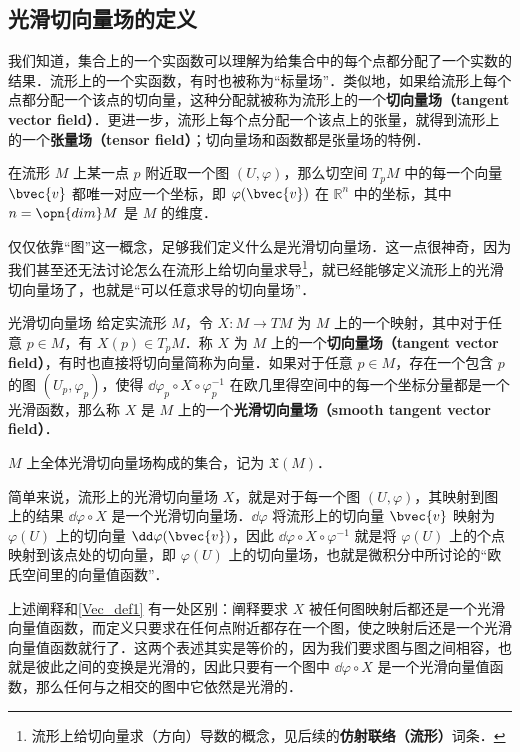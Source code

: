 
\subsection{光滑切向量场的定义}

我们知道，集合上的一个实函数可以理解为给集合中的每个点都分配了一个实数的结果．流形上的一个实函数，有时也被称为“标量场”．类似地，如果给流形上每个点都分配一个该点的切向量，这种分配就被称为流形上的一个\textbf{切向量场（tangent vector field）}．更进一步，流形上每个点分配一个该点上的张量，就得到流形上的一个\textbf{张量场（tensor field）}；切向量场和函数都是张量场的特例．


在流形 $M$ 上某一点 $p$ 附近取一个图 $(U, \varphi)$，那么切空间 $T_pM$ 中的每一个向量 $\bvec{v}$ 都唯一对应一个坐标，即 $\varphi(\bvec{v})$ 在 $\mathbb{R}^n$ 中的坐标，其中 $n=\opn{dim}M$ 是 $M$ 的维度．

仅仅依靠“图”这一概念，足够我们定义什么是光滑切向量场．这一点很神奇，因为我们甚至还无法讨论怎么在流形上给切向量求导\footnote{流形上给切向量求（方向）导数的概念，见后续的\textbf{仿射联络（流形）}词条．}，就已经能够定义流形上的光滑切向量场了，也就是“可以任意求导的切向量场”．

\begin{definition}{光滑切向量场}\label{Vec_def1}
给定实流形 $M$，令 $X:M\to TM$ 为 $M$ 上的一个映射，其中对于任意 $p\in M$，有 $X(p)\in T_pM$．称 $X$ 为 $M$ 上的一个\textbf{切向量场（tangent vector field）}，有时也直接将切向量简称为向量．如果对于任意 $p\in M$，存在一个包含 $p$ 的图 $(U_p, \varphi_p)$，使得 $\dd\varphi_p\circ X\circ\varphi_p^{-1}$ 在欧几里得空间中的每一个坐标分量都是一个光滑函数，那么称 $X$ 是 $M$ 上的一个\textbf{光滑切向量场（smooth tangent vector field）}．

$M$ 上全体光滑切向量场构成的集合，记为 $\mathfrak{X}(M)$．
\end{definition}

简单来说，流形上的光滑切向量场 $X$，就是对于每一个图 $(U, \varphi)$，其映射到图上的结果 $\dd\varphi\circ X$ 是一个光滑切向量场．$\dd\varphi$ 将流形上的切向量 $\bvec{v}$ 映射为 $\varphi(U)$ 上的切向量 $\dd\varphi(\bvec{v})$，因此 $\dd\varphi\circ X\circ\varphi^{-1}$ 就是将 $\varphi(U)$ 上的个点映射到该点处的切向量，即 $\varphi(U)$ 上的切向量场，也就是微积分中所讨论的“欧氏空间里的向量值函数”．

上述阐释和\autoref{Vec_def1} 有一处区别：阐释要求 $X$ 被任何图映射后都还是一个光滑向量值函数，而定义只要求在任何点附近都存在一个图，使之映射后还是一个光滑向量值函数就行了．这两个表述其实是等价的，因为我们要求图与图之间相容，也就是彼此之间的变换是光滑的，因此只要有一个图中 $\dd\varphi\circ X$ 是一个光滑向量值函数，那么任何与之相交的图中它依然是光滑的．

